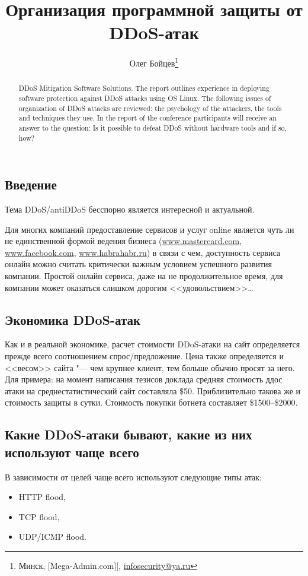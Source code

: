 \documentclass[10pt, a5paper]{article}
\begin{document}
\title{Организация программной защиты от DDoS-атак }

\author{Олег Бойцев\footnote{Минск, [Mega-Admin.com][, \url{infosecurity@ya.ru}}}
\maketitle

\begin{abstract}
DDoS Mitigation Software Solutions. The report outlines ex\-pe\-ri\-ence in deploying software protection against DDoS attacks using OS Linux. The following  issues of organization of DDoS attacks are reviewed: the psychology of the attackers, the tools and techniques they use. In the report of the conference participants will receive an answer to the question: Is it possible to defeat DDoS without hardware tools and if so, how?
\end{abstract}

\subsection*{Введение}
Тема DDoS/antiDDoS бесспорно является интересной и актуальной. 

Для многих компаний предоставление сервисов и услуг  online является чуть ли не единственной формой ведения бизнеса (\url{www.mastercard.com}, \url{www.facebook.com}, \url{www.habrahabr.ru}) в связи с чем, доступность сервиса онлайн можно считать критически важным условием успешного развития компании. Простой онлайн сервиса, даже на не продолжительное время, для компании может оказаться слишком дорогим <<удовольствием>>\ldots

\subsection*{Экономика DDoS-атак}
Как и в реальной экономике, расчет стоимости DDoS-атаки на сайт определяется прежде всего соотношением спрос/предложение. Цена также определяется и <<весом>> сайта "--- чем крупнее клиент, тем больше обычно просят за него.
Для примера: на момент написания тезисов доклада средняя стоимость ддос атаки на среднестатистический сайт составляла \$50. Приблизительно такова же и стоимость защиты в сутки. Стоимость покупки ботнета составляет \$1500--\$2000.

\subsection*{Какие DDoS-атаки бывают, какие из них используют чаще всего}
В зависимости от целей  чаще всего используют следующие типы атак:  
\begin{itemize}
\item HTTP flood,
\item TCP flood,
\item UDP/ICMP flood.
\end{itemize}
\end{document}
